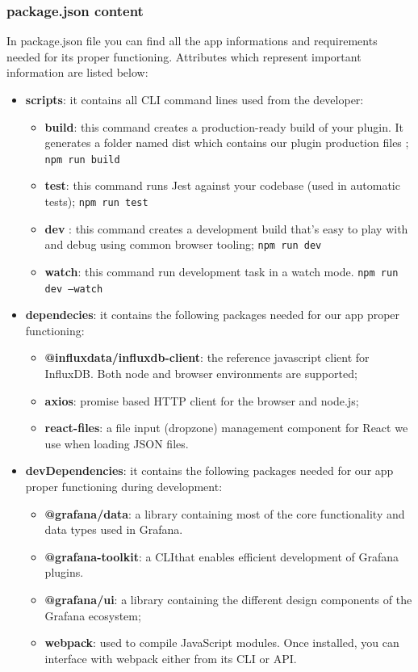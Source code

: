 		\subsubsection{package.json content}
In package.json file you can find all the app informations and requirements needed for its proper functioning. Attributes which represent important information are listed below:
		\begin{itemize}
			\item\textbf{scripts}: it contains all CLI command lines used from the developer: 
				\begin{itemize}
				\item\textbf{build}: this command creates a production-ready build of your plugin. It generates a folder named dist which contains our plugin production files ;
				\newline\texttt{npm run build}
				\item\textbf{test}: this command runs Jest against your codebase (used in automatic tests);
				\newline\texttt{npm run test}
				\item\textbf{dev} : this command creates a development build that's easy to play with and debug using common browser tooling;
				\newline\texttt{npm run dev}
				\item\textbf{watch}: this command run development task in a watch mode.
				\newline\texttt{npm run dev --watch}
			\end{itemize}
			\item\textbf{dependecies}: it contains the following packages needed for our app proper functioning:
			\begin{itemize}
				\item\textbf{@influxdata/influxdb-client}: the reference javascript client for InfluxDB. Both node and browser environments are supported;
    			\item\textbf{axios}: promise based HTTP client for the browser and node.js;
    			\item\textbf{react-files}: a file input (dropzone) management component for React we use when loading JSON files.
			\end{itemize}
			\item\textbf{devDependencies}: it contains the following packages needed for our app proper functioning during development:
			\begin{itemize}
				\item\textbf{@grafana/data}: a library containing most of the core functionality and data types used in Grafana.
				\item\textbf{@grafana-toolkit}: a CLI\glo that enables efficient development of Grafana plugins.
				\item\textbf{@grafana/ui}: a library containing the different design components of the Grafana ecosystem;
				\item\textbf{webpack}: used to compile JavaScript modules. Once installed, you can interface with webpack either from its CLI or API.
			\end{itemize}
		\end{itemize}
		
